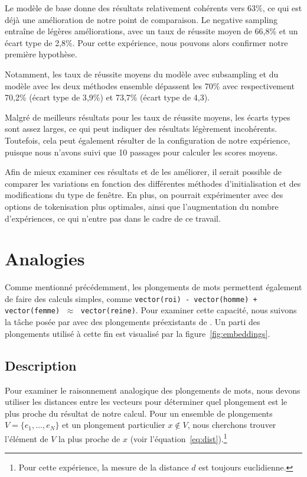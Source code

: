 \documentclass[12pt]{article}
\begin{document}
Le modèle de base donne des résultats relativement cohérents vers 63\%, ce qui est déjà une amélioration de notre point de comparaison. Le negative sampling entraîne de légères améliorations, avec un taux de réussite moyen de 66{,}8\% et un écart type de 2{,}8\%. Pour cette expérience, nous pouvons alors confirmer notre première hypothèse. 

Notamment, les taux de réussite moyens du modèle avec subsampling et du modèle avec les deux méthodes ensemble dépassent les 70\% avec respectivement 70{,}2\% (écart type de 3{,}9\%) et 73{,}7\% (écart type de 4{,}3).

Malgré de meilleurs résultats pour les taux de réussite moyens, les écarts types sont assez larges, ce qui peut indiquer des résultats légèrement incohérents. Toutefois, cela peut également résulter de la configuration de notre expérience, puisque nous n'avons suivi que 10 passages pour calculer les scores moyens. 

Afin de mieux examiner ces résultats et de les améliorer, il serait possible de comparer les variations en fonction des différentes méthodes d'initialisation et des modifications du type de fenêtre. En plus, on pourrait expérimenter avec des options de tokenisation plus optimales, ainsi que l'augmentation du nombre d'expériences, ce qui n’entre pas dans le cadre de ce travail.

\section{Analogies} \label{analogies}

Comme mentionné précédemment, les plongements de mots permettent également de faire des calculs simples, comme \texttt{vector(roi) - vector(homme) + vector(femme)} $\;\approx\;$ \texttt{vector(reine)}. Pour examiner cette capacité, nous suivons la tâche posée par \cite{DBLP:journals/corr/abs-1301-3781} avec des plongements préexistants de \cite{fares-etal-2017-word}. Un parti des plongements utilisé à cette fin est visualisé par la figure~\ref{fig:embeddings}. 

\subsection{Description} \label{description-2}

Pour examiner le raisonnement analogique des plongements de mots, nous devons utiliser les distances entre les vecteurs pour déterminer quel plongement est le plus proche du résultat de notre calcul. Pour un ensemble de plongements $V = \{e_1, \dotsc, e_N\}$ et un plongement particulier $x \notin V$, nous cherchons trouver l'élément de $ V $ la plus proche de $x$ (voir l'équation~\ref{eq:dist}).\footnote{Pour cette expérience, la mesure de la distance $d$ est toujours euclidienne.}
\end{document}
